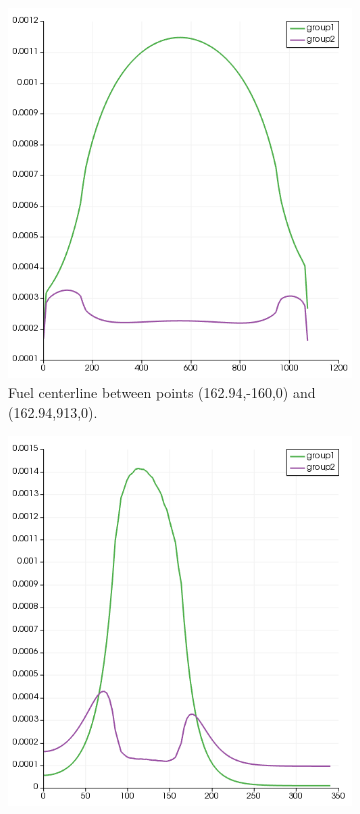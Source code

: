 \documentclass[11pt,letterpaper]{article}
\begin{document}
	\begin{figure}[htbp!]
		\centering
		\begin{subfigure}[t]{0.4\textwidth}
			\centering
			\includegraphics[width=\linewidth]{2D-fullcore-reflecB-action1}
			\caption{Fuel centerline between points (162.94,-160,0) and (162.94,913,0).}
		\end{subfigure}
		\begin{subfigure}[t]{0.4\textwidth}
			\centering
			\includegraphics[width=\linewidth]{2D-fullcore-reflecB-action2}

\end{subfigure}
\end{figure}
\end{document}
